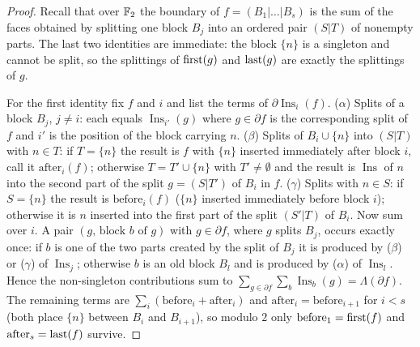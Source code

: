 \begin{proof}
Recall that over $\mathbb{F}_2$ the boundary of $f=(B_1|\dots|B_s)$ is the sum of the faces obtained by splitting one block $B_j$ into an ordered pair $(S|T)$ of nonempty parts. The last two identities are immediate: the block $\{n\}$ is a singleton and cannot be split, so the splittings of $\mathrm{first}(g)$ and $\mathrm{last}(g)$ are exactly the splittings of $g$.

For the first identity fix $f$ and $i$ and list the terms of $\partial\operatorname{Ins}_i(f)$. (\emph{$\alpha$}) Splits of a block $B_j$, $j\ne i$: each equals $\operatorname{Ins}_{i'}(g)$ where $g\in\partial f$ is the corresponding split of $f$ and $i'$ is the position of the block carrying $n$. (\emph{$\beta$}) Splits of $B_i\cup\{n\}$ into $(S|T)$ with $n\in T$: if $T=\{n\}$ the result is $f$ with $\{n\}$ inserted immediately after block $i$, call it $\mathrm{after}_i(f)$; otherwise $T=T'\cup\{n\}$ with $T'\ne\emptyset$ and the result is $\operatorname{Ins}$ of $n$ into the second part of the split $g=(S|T')$ of $B_i$ in $f$. (\emph{$\gamma$}) Splits with $n\in S$: if $S=\{n\}$ the result is $\mathrm{before}_i(f)$ ($\{n\}$ inserted immediately before block $i$); otherwise it is $n$ inserted into the first part of the split $(S'|T)$ of $B_i$.
Now sum over $i$. A pair $(g,\,\text{block }b\text{ of }g)$ with $g\in\partial f$, where $g$ splits $B_j$, occurs exactly once: if $b$ is one of the two parts created by the split of $B_j$ it is produced by ($\beta$) or ($\gamma$) of $\operatorname{Ins}_j$; otherwise $b$ is an old block $B_l$ and is produced by ($\alpha$) of $\operatorname{Ins}_l$. Hence the non-singleton contributions sum to $\sum_{g\in\partial f}\sum_b\operatorname{Ins}_b(g)=\Lambda(\partial f)$. The remaining terms are $\sum_i(\mathrm{before}_i+\mathrm{after}_i)$ and $\mathrm{after}_i=\mathrm{before}_{i+1}$ for $i<s$ (both place $\{n\}$ between $B_i$ and $B_{i+1}$), so modulo $2$ only $\mathrm{before}_1=\mathrm{first}(f)$ and $\mathrm{after}_s=\mathrm{last}(f)$ survive.
\end{proof}
